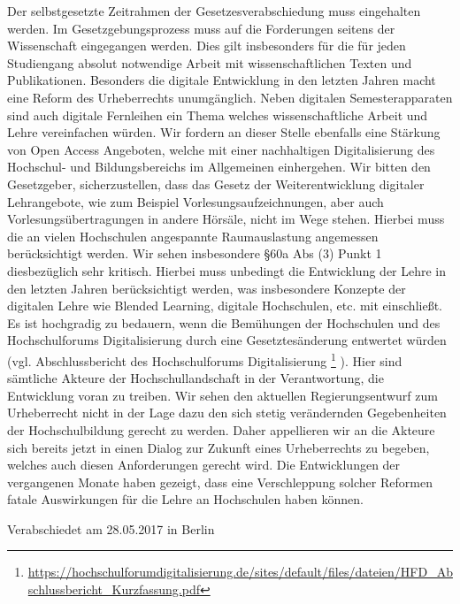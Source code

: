 \documentclass[DIV=calc]{scrartcl}
\begin{document}
Der selbstgesetzte Zeitrahmen der Gesetzesverabschiedung muss eingehalten werden. Im Gesetzgebungsprozess muss auf die Forderungen  seitens der Wissenschaft eingegangen werden. Dies gilt insbesonders für  die für jeden Studiengang absolut notwendige Arbeit mit wissenschaftlichen Texten und Publikationen. Besonders die digitale  Entwicklung in den letzten Jahren macht eine Reform des Urheberrechts  unumgänglich. Neben digitalen Semesterapparaten sind auch digitale Fernleihen ein Thema welches wissenschaftliche Arbeit und Lehre  vereinfachen würden. Wir fordern an dieser Stelle ebenfalls eine Stärkung von Open Access  Angeboten, welche mit einer nachhaltigen Digitalisierung des Hochschul-  und Bildungsbereichs im Allgemeinen einhergehen. Wir bitten den Gesetzgeber, sicherzustellen, dass das Gesetz der  Weiterentwicklung digitaler Lehrangebote, wie zum Beispiel  Vorlesungsaufzeichnungen, aber auch  Vorlesungsübertragungen in andere Hörsäle, nicht im Wege stehen. Hierbei muss die an vielen Hochschulen angespannte Raumauslastung angemessen berücksichtigt werden. Wir sehen insbesondere  §60a Abs (3) Punkt 1 diesbezüglich sehr kritisch. Hierbei muss unbedingt die Entwicklung der Lehre in den letzten Jahren berücksichtigt werden, was insbesondere Konzepte der digitalen Lehre wie Blended Learning, digitale Hochschulen, etc. mit einschließt. Es ist hochgradig zu bedauern, wenn die Bemühungen der Hochschulen und des Hochschulforums Digitalisierung durch eine Gesetztesänderung entwertet würden (vgl. Abschlussbericht des Hochschulforums Digitalisierung \footnote{\url{https://hochschulforumdigitalisierung.de/sites/default/files/dateien/HFD_Abschlussbericht_Kurzfassung.pdf}} ). Hier sind sämtliche  Akteure der Hochschullandschaft in der Verantwortung, die Entwicklung  voran zu treiben. Wir sehen den aktuellen Regierungsentwurf zum  Urheberrecht nicht in der Lage dazu den sich stetig verändernden Gegebenheiten der Hochschulbildung gerecht zu werden. Daher appellieren  wir an die Akteure sich bereits
 jetzt in einen Dialog zur Zukunft eines  Urheberrechts zu begeben, welches auch diesen Anforderungen gerecht  wird. Die Entwicklungen der vergangenen Monate haben gezeigt, dass eine Verschleppung solcher Reformen fatale Auswirkungen für die Lehre an Hochschulen haben können.
    \vfill
    \begin{flushright}
        Verabschiedet am 28.05.2017 in Berlin
    \end{flushright}
    
\end{document}
